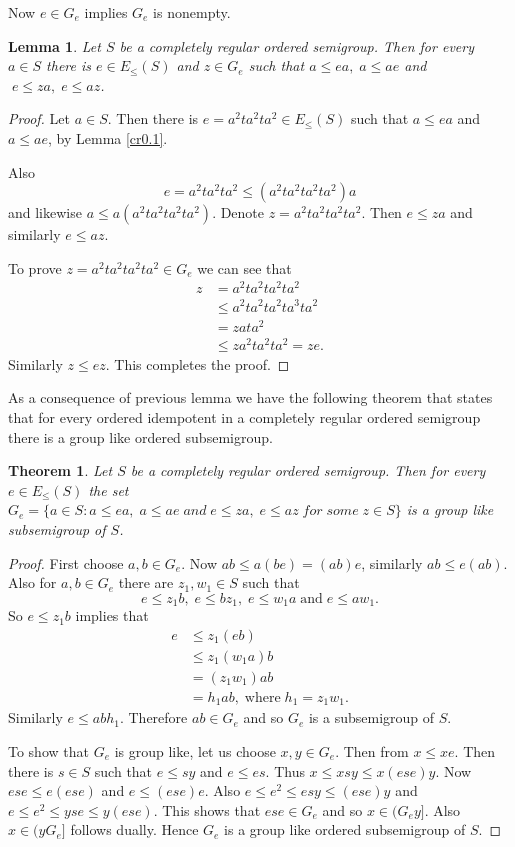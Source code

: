 \documentclass[13pt]{article}
\newtheorem{Theorem}[theorem]{Theorem}
\newtheorem{Lemma}[theorem]{Lemma}
\theoremstyle{definition}
\theoremstyle{remark}
\numberwithin{equation}{section}
\begin{document}
Now  $e \in G_e$ implies $G_e$ is nonempty.
\begin{Lemma}\label{cr0.2}
Let $S$ be a completely regular ordered semigroup. Then for every $a
\in S$ there is $e \in E_\leq(S)$ and $z \in G_e$ such that  $a \leq
ea, \;a \leq ae$ and  $ \;e \leq za, \;e\leq az$.
\end{Lemma}
\begin{proof}
Let $a \in S$. Then there is $e= a^2 ta^2 ta^2 \in E_\leq(S)$ such
that $a \leq ea $ and $a \leq ae$, by Lemma \ref{cr0.1}.

Also $$e= a^2 ta^2 ta^2 \leq (a^2 ta^2 ta^2 ta^2) a$$ and likewise
$a \leq a(a^2 ta^2 ta^2 ta^2)$. Denote  $z= a^2 ta^2 ta^2 ta^2$.
Then $e \leq za$ and similarly $e \leq az$.

To prove  $z= a^2 ta^2 ta^2 ta^2 \in G_e$ we can see that
\begin{align*}
z &= a^2 ta^2 ta^2 ta^2\\
  &\leq a^2 ta^2 ta^2 ta^3ta^2\\
  &=zata^2\\
  &\leq za^2 ta^2 ta^2=ze.
\end{align*}
  Similarly $z \leq ez$. This completes the proof.
\end{proof}
As a consequence of previous lemma  we have the following theorem
that states that for every ordered idempotent in a completely
regular ordered semigroup there is a group like ordered
subsemigroup.
\begin{Theorem}\label{2.1}
Let $S$ be a completely regular ordered semigroup. Then for  every
$e \in E_\leq(S)$ the set $G_e= \{a \in S: a \leq ea, \;a \leq ae
\;and \;e \leq za, \;e \leq az \;for \;some \;z\in S\}$ is a group
like subsemigroup of $S$.
\end{Theorem}
\begin{proof}
First choose $a, b \in G_e$. Now $ab \leq a(be)= (ab)e$, similarly
$ab \leq e(ab)$. Also for $a,b \in G_e$ there are $z_1, w_1 \in S$
such that $$e \leq z_1b, \;e \leq bz_1, \;e \leq w_1 a
\;\textrm{and} \;e \leq aw_1.$$ So $e \leq z_1b$ implies that
\begin{align*}
e &\leq z_1(eb)\\
  & \leq z_1(w_1a)b\\
  &= (z_1w_1) ab\\
  &=h_1 ab, \;\textrm{where} \;h_1=
z_1 w_1.
\end{align*}
Similarly $e \leq ab h_1$.  Therefore $ab \in G_e$ and so $G_e$ is a
subsemigroup of $S$.

To show that $G_e$ is  group like,  let us choose $x, y \in G_e$.
Then from $x \leq xe$. Then there is $s \in S$ such that $e \leq sy$
and $e \leq es$. Thus  $x \leq xs y \leq x(ese)y$. Now $ese \leq
e(ese)$ and $e \leq (ese)e$. Also $e \leq e^2 \leq esy \leq (ese)y$
and $e \leq e^2 \leq yse\leq y(ese)$. This shows that $ese \in G_e$
and so $x\in (G_ey]$. Also $x\in (yG_e]$ follows dually.   Hence
$G_e$ is a group like ordered subsemigroup of $S$.
\end{proof}
\end{document}
